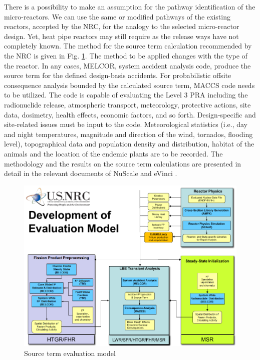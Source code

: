 \documentclass[10pt,a4paper]{article}
\begin{document}
There is a possibility to make an assumption for the pathway identification of the micro-reactors. We can use the same or modified pathways of the existing reactors, accepted by the NRC, for the analogy to the selected micro-reactor design. Yet, heat pipe reactors may still require as the release ways have not completely known.
The method for the source term calculation recommended by the NRC is given in Fig. \ref{sourceterm}. The method to be applied changes with the type of the reactor. In any cases, MELCOR, system accident analysis code, produce the source term for the defined design-basis accidents. 
For probabilistic offsite consequence analysis bounded by the calculated source term, MACCS code needs to be utilized. The code is capable of evaluating the Level 3 PRA including the radionuclide release, atmospheric transport, meteorology, protective actions, site data, dosimetry, health effects, economic factors, and so forth. Design-specific and site-related issues must be input to the code.  Meteorological statistics (i.e., day and night temperatures, magnitude and direction of the wind, tornados, flooding level), topographical data and population density and distribution, habitat of the animals and the location of the endemic plants are to be recorded.   
The methodology and the results on the source term calculations are presented in detail in the relevant documents of NuScale \cite{NuChapter19} and eVinci \cite{Southern19}.

\begin{figure}[hbtp]
\centering
\includegraphics[scale=0.6]{Figs/sourceterm.jpeg}
\caption{Source term evaluation model}
\label{sourceterm}
\end{figure}
\end{document}
